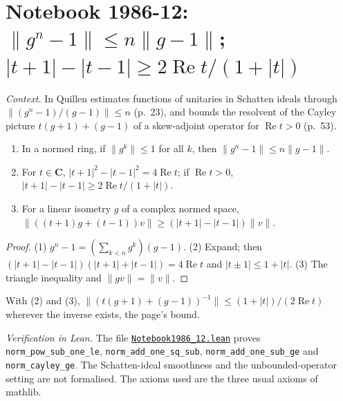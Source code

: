 \section[Notebook 1986-12: the geometric-sum bound; the Cayley resolvent bound]{Notebook 1986-12: $\|g^n - 1\| \le n\|g - 1\|$; $|t + 1| - |t - 1| \ge 2\operatorname{Re}t/(1 + |t|)$\protect{}}\label{sec:quillen-1986-12}

\emph{Context.} In  Quillen estimates functions of unitaries in Schatten ideals through $\|(g^n - 1)/(g - 1)\| \le n$ (p.~23), and bounds the resolvent of the Cayley picture $t(g + 1) + (g - 1)$ of a skew-adjoint operator for $\operatorname{Re}t > 0$ (p.~53).

\begin{encadre}
\begin{theoreme}\label{thm:quillen-1986-12}\leavevmode
\begin{enumerate}
\item In a normed ring, if $\|g^k\| \le 1$ for all $k$, then $\|g^n - 1\| \le n\|g - 1\|$.
\item For $t \in \mathbf C$, $|t + 1|^2 - |t - 1|^2 = 4\operatorname{Re}t$; if $\operatorname{Re}t > 0$, $|t + 1| - |t - 1| \ge 2\operatorname{Re}t/(1 + |t|)$.
\item For a linear isometry $g$ of a complex normed space, $\|((t + 1)g + (t - 1))v\| \ge (|t + 1| - |t - 1|)\|v\|$.
\end{enumerate}
\end{theoreme}
\end{encadre}

\begin{proof}
(1) $g^n - 1 = (\sum_{k<n}g^k)(g - 1)$. (2) Expand; then $(|t + 1| - |t - 1|)(|t + 1| + |t - 1|) = 4\operatorname{Re}t$ and $|t \pm 1| \le 1 + |t|$. (3) The triangle inequality and $\|gv\| = \|v\|$.
\end{proof}

With (2) and (3), $\|(t(g + 1) + (g - 1))^{-1}\| \le (1 + |t|)/(2\operatorname{Re}t)$ wherever the inverse exists, the page's bound.

\emph{Verification in Lean.} The file \href{\leanblobmain/Notebook1986_12.lean}{\texttt{Notebook1986\_12.\allowbreak{}lean}} proves \texttt{norm\_pow\_sub\_one\_le}, \texttt{norm\_add\_one\_sq\_sub}, \texttt{norm\_add\_one\_sub\_ge} and \texttt{norm\_cayley\_ge}. The Schatten-ideal smoothness and the unbounded-operator setting are not formalised. The axioms used are the three usual axioms of mathlib.

